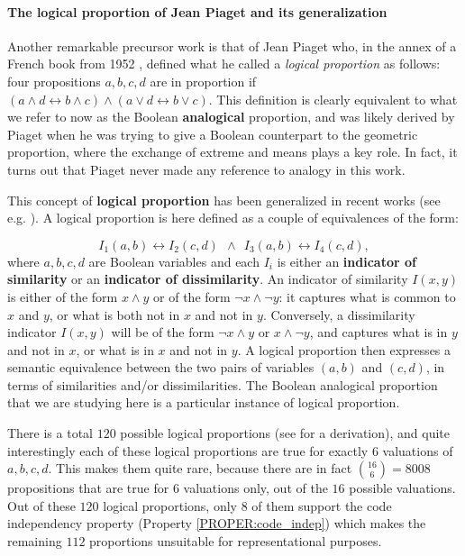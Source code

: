 \paragraph{The logical proportion of Jean Piaget and its generalization\\}
Another remarkable precursor work is that of Jean Piaget who, in the annex of a
French book from 1952 \cite{Pia52}, defined what he called a \textit{logical
proportion} as follows: four propositions $a, b, c,d$ are in proportion if $(a
\wedge d \leftrightarrow b \wedge c) \wedge (a \vee  d \leftrightarrow b \vee
c)$. This definition is clearly equivalent to what we refer to now as the
Boolean \textbf{analogical} proportion, and was likely derived by Piaget when
he was trying to give a Boolean counterpart to the geometric proportion, where
the exchange of extreme and means plays a key role. In fact, it turns out that
Piaget never made any reference to analogy in this work.

This concept of \textbf{logical proportion} has been generalized in recent
works (see e.g. \cite{PraRic13LU}). A logical proportion is here defined as a
couple of equivalences of the form:

$$I_1(a, b) \leftrightarrow I_2(c, d) ~~ \wedge ~~ I_3(a, b) \leftrightarrow I_4(c,
d),$$
where $a, b, c, d$ are Boolean variables and each $I_i$ is either an
\textbf{indicator of similarity} or an \textbf{indicator of dissimilarity}. An
indicator of similarity $I(x, y)$ is either of the form $x \wedge y$  or
of the form $\neg x \wedge \neg y$: it captures what is common to $x$ and $y$,
or what is both not in $x$ and not in $y$. Conversely, a dissimilarity indicator $I(x,
y)$ will be of the form $\neg x \wedge y$ or $x \wedge \neg y$,  and captures
what is in $y$ and not in $x$, or what is in $x$ and not in $y$.  A logical
proportion then expresses a semantic equivalence between the two pairs of
variables $(a, b)$ and $(c, d)$, in terms of similarities and/or
dissimilarities. The Boolean analogical proportion that we are studying here is
a particular instance of logical proportion.

There is a total $120$ possible logical proportions (see \cite{PraRic12} for a
derivation), and quite interestingly each of these logical proportions are
true for exactly $6$ valuations of $a, b, c, d$. This makes them quite rare,
because there are in fact $\binom{16}{6} = 8008$ propositions that are true for
$6$ valuations only, out of the $16$ possible valuations. Out of these $120$
logical proportions, only $8$ of them support the code independency property
(Property \ref{PROPER:code_indep}) which makes the remaining $112$ proportions
unsuitable for representational purposes.

